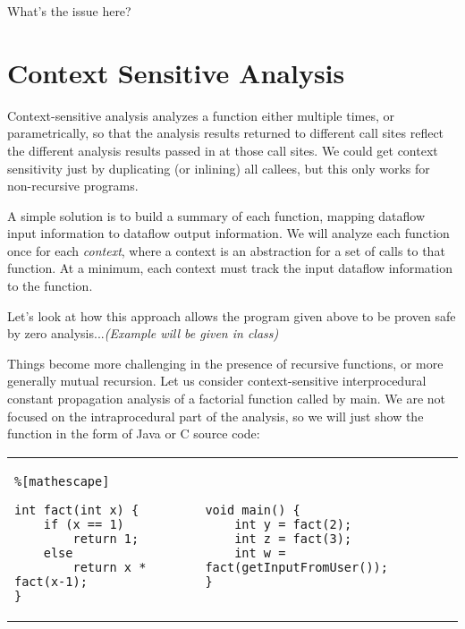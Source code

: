 \documentclass[11pt]{article}
\begin{document}
\noindent What's the issue here?


\section{Context Sensitive Analysis}

Context-sensitive analysis analyzes a function either multiple times, or parametrically, so that the analysis results returned to different call sites reflect the different analysis results passed in at those call sites.
%
We could get context sensitivity just by duplicating (or inlining) all callees, but this only works for non-recursive programs.

A simple solution is to build a summary of each function, mapping dataflow input information to dataflow output information.  We will analyze each function once for each \textit{context}, where a context is an abstraction for a set of calls to that function.  At a minimum, each context must track the input dataflow information to the function.

Let's look at how this approach allows the program given above to be proven safe by zero analysis...\textit{(Example will be given in class)}


Things become more challenging in the presence of recursive functions, or more generally mutual recursion.  Let us consider context-sensitive interprocedural constant propagation analysis of a factorial function called by main.  We are not focused on the intraprocedural part of the analysis, so we will just show the function in the form of Java or C source code:

\vspace{1ex}
\begin{tabular}{ll}
\begin{lstlisting}%[mathescape]

int fact(int x) {
    if (x == 1)
        return 1;
    else
        return x * fact(x-1);
}
\end{lstlisting} &\hspace{2ex}
\begin{lstlisting}

void main() {
    int y = fact(2);
    int z = fact(3);
    int w = fact(getInputFromUser());
}
\end{lstlisting} \\
\end{tabular}
\vspace{1ex}
\end{document}
